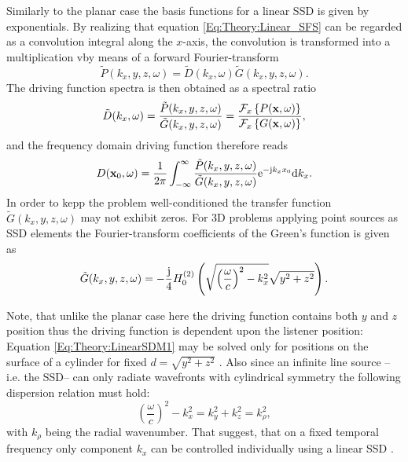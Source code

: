 Similarly to the planar case the basis functions for a linear SSD is given by exponentials.
By realizing that equation \eqref{Eq:Theory:Linear_SFS} can be regarded as a convolution integral along the $x$-axis,
the convolution is transformed into a multiplication vby means of a forward Fourier-transform
\begin{equation}
\tilde{P}(k_x,y,z, \omega) = \tilde{D}(k_x,\omega)\tilde{G}(k_x,y,z, \omega).
\end{equation}
The driving function spectra is then obtained as a spectral ratio
\begin{equation}
\tilde{D}(k_x,\omega) = \frac{\tilde{P}(k_x,y,z, \omega)}{\tilde{G}(k_x,y,z, \omega)} = \frac{\mathcal{F}_x\left\{ P(\mathbf{x},\omega) \right\}}{\mathcal{F}_x\left\{ G(\mathbf{x},\omega) \right\}},
\end{equation}
and the frequency domain driving function therefore reads
\begin{equation}
D(\mathbf{x}_0,\omega) = \frac{1}{2\pi} \int_{-\infty}^{\infty} \frac{\tilde{P}(k_x,y,z, \omega) }{\tilde{G}(k_x,y,z, \omega)} \mathrm{e}^{-\mathrm{j} k_x x_0} \mathrm{d} k_x.
\label{Eq:Theory:LinearSDM1}
\end{equation}
In order to kepp the problem well-conditioned the transfer function $\tilde{G}(k_x,y,z, \omega)$ may not exhibit zeros.
For 3D problems applying point sources as SSD elements the Fourier-transform coefficients of the Green's function is given as \cite{Ahrens2010a}
\begin{equation}
\tilde{G}(k_x,y,z,\omega) = -\frac{\mathrm{j}}{4} H_0^{(2)}\left( \sqrt{ \left( \frac{\omega}{c} \right)^2 - k_x^2 } \sqrt{ y^2 + z^2 } \right).
\end{equation}

\vspace{3mm}
Note, that unlike the planar case here the driving function contains both $y$ and $z$ position thus the driving function is dependent upon the listener position: Equation \eqref{Eq:Theory:LinearSDM1} may be solved only for positions on the surface of a cylinder for fixed $d = \sqrt{y^2 + z^2}$ \cite[p.~60.]{Ahrens2010phd}.
Also since an infinite line source --i.e. the SSD-- can only radiate wavefronts with cylindrical symmetry the following  dispersion relation must hold:
\begin{equation}
\left( \frac{\omega} {c}\right)^2 - k_x^2 = k_y^2 + k_z^2 = k_{\rho}^2,
\end{equation}
with $k_{\rho}$ being the radial wavenumber. That suggest, that on a fixed temporal frequency only component $k_x$ can be controlled individually using a linear SSD .

